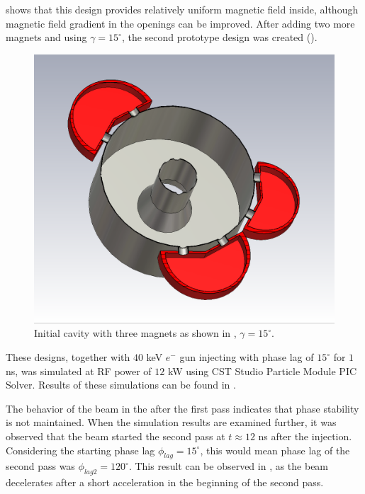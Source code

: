 \documentclass{article}
\begin{document}
 shows that this design provides relatively uniform magnetic field inside, although magnetic field gradient in the openings can be improved.
After adding two more magnets and using $\gamma=15^\circ$, the second prototype design was created ().

\vspace{20pt}
\begin{figure}[H]
    \centering
    \includegraphics[width=.6\linewidth]{../../../figures/cst/cst_second_design2.png}
    \vspace{0pt}
    \caption{Initial cavity with three magnets as shown in , $\gamma=15^\circ$.}
    \label{fig:initial_three_magnet_design}
    \vspace{-10pt}
\end{figure}

These designs, together with $40$ keV $e^-$ gun injecting with phase lag of $15^\circ$ for $1$ ns, was simulated at RF power of $12$ kW using CST Studio Particle Module PIC Solver.
Results of these simulations can be found in .

The behavior of the beam in the  after the first pass indicates that phase stability is not maintained. 
When the simulation results are examined further, it was observed that the beam started the second pass at $t \approx 12$ ns after the injection. 
Considering the starting phase lag $\phi_{lag}=15^\circ$, this would mean phase lag of the second pass was $\phi_{lag2}=120^\circ$.
This result can be observed in , as the beam decelerates after a short acceleration in the beginning of the second pass.
\end{document}
